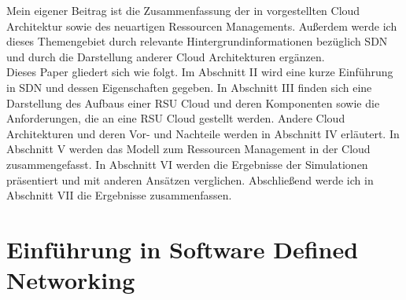 \documentclass[conference]{IEEEtran}
\begin{document}
Mein eigener Beitrag ist die Zusammenfassung der in \cite{IEEEhowto:orig} vorgestellten Cloud Architektur sowie des neuartigen Ressourcen Managements. Außerdem werde ich dieses Themengebiet durch relevante Hintergrundinformationen bezüglich SDN und durch die Darstellung anderer Cloud Architekturen ergänzen.\\
Dieses Paper gliedert sich wie folgt. Im Abschnitt II wird eine kurze Einführung in SDN und dessen Eigenschaften gegeben. In Abschnitt III finden sich eine Darstellung des Aufbaus einer RSU Cloud und deren Komponenten sowie die Anforderungen, die an eine RSU Cloud gestellt werden. Andere Cloud Architekturen und deren Vor- und Nachteile werden in Abschnitt IV erläutert. In Abschnitt V werden das Modell zum Ressourcen Management in der Cloud zusammengefasst. In Abschnitt VI werden die Ergebnisse der Simulationen präsentiert und mit anderen Ansätzen verglichen. Abschließend werde ich in Abschnitt VII die Ergebnisse zusammenfassen.



\section{Einführung in Software Defined Networking}
\end{document}
